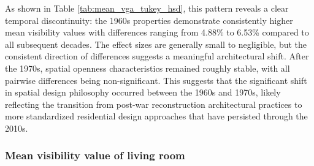 As shown in Table \ref{tab:mean_vga_tukey_hsd}, this pattern reveals a clear temporal discontinuity: the 1960s properties demonstrate consistently higher 
mean visibility values with differences ranging from 4.88\% to 6.53\% compared to all subsequent decades. The 
effect sizes are generally small to negligible, but the consistent direction of differences suggests a 
meaningful architectural shift. After the 1970s, spatial openness characteristics remained roughly 
stable, with all pairwise differences being non-significant. This suggests 
that the significant shift in spatial design philosophy occurred between the 1960s and 1970s, likely 
reflecting the transition from post-war reconstruction architectural practices to more standardized 
residential design approaches that have persisted through the 2010s.

\subsubsection{Mean visibility value of living room}
